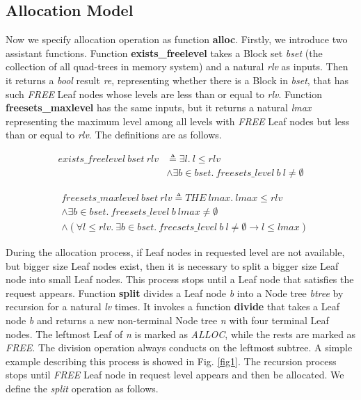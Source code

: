 \subsection{Allocation Model}
Now we specify allocation operation as function \textbf{alloc}. Firstly, we introduce two assistant functions. Function \textbf{exists\_freelevel} takes a Block set \emph{bset} (the collection of all quad-trees in memory system) and a natural \emph{rlv} as inputs. Then it returns a \emph{bool} result \emph{re}, representing whether there is a Block in \emph{bset}, that has such \emph{FREE} Leaf nodes whose levels are less than or equal to \emph{rlv}. Function \textbf{freesets\_maxlevel} has the same inputs, but it returns a natural \emph{lmax} representing the maximum level among all levels with \emph{FREE} Leaf nodes but less than or equal to \emph{rlv}. The definitions are as follows.

\begin{definition} 
\end{definition}
\vspace{-7pt}
{\footnotesize
\begin{align*}
exists\_freelevel\ bset\ rlv &\triangleq \exists l.\ l \leq rlv \\
&\wedge \exists b \in bset.\ freesets\_level\ b\ l \ne \emptyset
\end{align*}
}
\vspace{-12pt}

\begin{definition} 
\end{definition}
\vspace{-7pt}	
{\footnotesize
\begin{align*}
&freesets\_maxlevel\ bset\ rlv \triangleq THE\ lmax.\ lmax \leq rlv \\
&\wedge \exists b \in bset.\ freesets\_level\ b\ lmax \neq \emptyset \\
&\wedge (\forall l \leq rlv.\ \exists b \in bset.\ freesets\_level\ b\ l \ne \emptyset \longrightarrow l \leq lmax)
\end{align*}
}
\vspace{-12pt}

During the allocation process, if Leaf nodes in requested level are not available, but bigger size Leaf nodes exist, then it is necessary to split a bigger size Leaf node into small Leaf nodes. This process stops until a Leaf node that satisfies the request appears. Function \textbf{split} divides a Leaf node \emph{b} into a Node tree \emph{btree} by recursion for a natural \emph{lv} times. It invokes a function \textbf{divide} that takes a Leaf node \emph{b} and returns a new non-terminal Node tree \emph{n} with four terminal Leaf nodes. The leftmost Leaf of \emph{n} is marked as \emph{ALLOC}, while the rests are marked as \emph{FREE}. The division operation always conducts on the leftmost subtree. A simple example describing this process is showed in Fig. \ref{fig1}. The recursion process stops until \emph{FREE} Leaf node in request level appears and then be allocated. We define the \emph{split} operation as follows.

